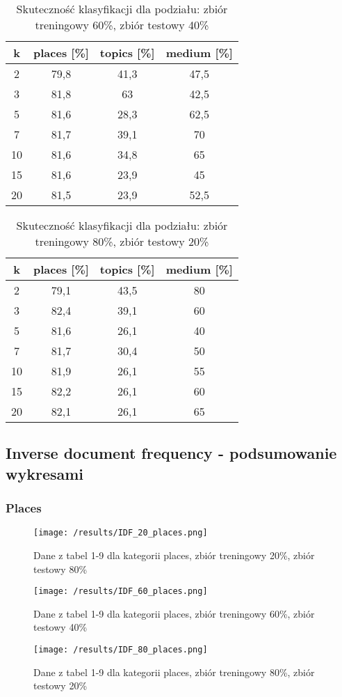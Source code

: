 \documentclass{classrep}
\begin{document}
\begin{table}[H]
	\centering
	\begin{tabular}{c c c c} 
		\hline
		\textbf{k} & \textbf{places [\%]} & \textbf{topics [\%]} &  \textbf{medium [\%]} \\ [0.5ex] 
		\hline
		\hline 
2 & 79,8 & 41,3 & 47,5 \\ 
3 & 81,8 & 63 & 42,5 \\ 
5 & 81,6 & 28,3 & 62,5 \\ 
7 & 81,7 & 39,1 & 70 \\ 
10 & 81,6 & 34,8 & 65 \\ 
15 & 81,6 & 23,9 & 45 \\ 
20 & 81,5 & 23,9 & 52,5 \\ 
		\hline
	\end{tabular}
	\caption{Skuteczność klasyfikacji dla podziału: zbiór treningowy 60\%, zbiór testowy 40\%}
\end{table}

\begin{table}[H]
	\centering
	\begin{tabular}{c c c c} 
		\hline
		\textbf{k} & \textbf{places [\%]} & \textbf{topics [\%]} &  \textbf{medium [\%]} \\ [0.5ex] 
		\hline
		\hline 
2 & 79,1 & 43,5 & 80 \\ 
3 & 82,4 & 39,1 & 60 \\ 
5 & 81,6 & 26,1 & 40 \\ 
7 & 81,7 & 30,4 & 50 \\ 
10 & 81,9 & 26,1 & 55 \\ 
15 & 82,2 & 26,1 & 60 \\ 
20 & 82,1 & 26,1 & 65 \\ 
		\hline
	\end{tabular}
	\caption{Skuteczność klasyfikacji dla podziału: zbiór treningowy 80\%, zbiór testowy 20\%}
\end{table}

\subsection{Inverse document frequency - podsumowanie wykresami}
\subsubsection{Places}
\begin{figure}[H]
	\centering
	\texttt{[image: /results/IDF\_20\_places.png]}
	\caption{Dane z tabel 1-9 dla kategorii places, zbiór treningowy 20\%, zbiór testowy 80\%}
\end{figure}
\begin{figure}[H]
	\centering
	\texttt{[image: /results/IDF\_60\_places.png]}
	\caption{Dane z tabel 1-9 dla kategorii places, zbiór treningowy 60\%, zbiór testowy 40\%}
\end{figure}
\begin{figure}[H]
	\centering
	\texttt{[image: /results/IDF\_80\_places.png]}
	\caption{Dane z tabel 1-9 dla kategorii places, zbiór treningowy 80\%, zbiór testowy 20\%}
\end{figure}
\end{document}
